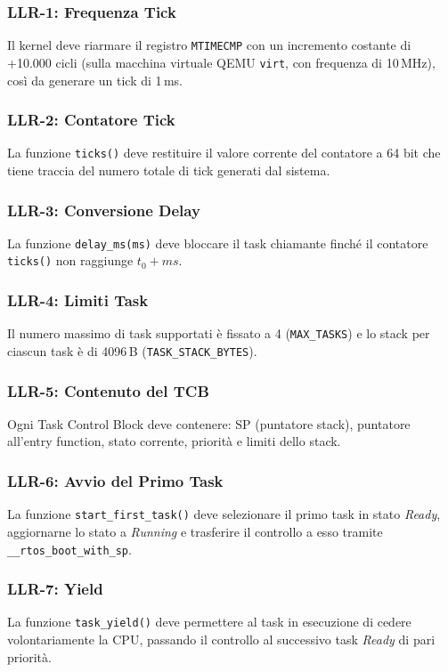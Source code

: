 \documentclass[italian, Lau, oneside]{sapthesis} %
\begin{document}
\subsubsection*{LLR-1: Frequenza Tick}
Il kernel deve riarmare il registro \texttt{MTIMECMP} con un incremento costante di +10.000 cicli (sulla macchina virtuale QEMU \texttt{virt}, con frequenza di 10\,MHz), così da generare un tick di 1\,ms.  

\subsubsection*{LLR-2: Contatore Tick}
La funzione \texttt{ticks()} deve restituire il valore corrente del contatore a 64 bit che tiene traccia del numero totale di tick generati dal sistema. 

\subsubsection*{LLR-3: Conversione Delay}
La funzione \texttt{delay\_ms(ms)} deve bloccare il task chiamante finché il contatore \texttt{ticks()} non raggiunge \(t_0 + ms\).  

\subsubsection*{LLR-4: Limiti Task}
Il numero massimo di task supportati è fissato a 4 (\texttt{MAX\_TASKS}) e lo stack per ciascun task è di 4096\,B (\texttt{TASK\_STACK\_BYTES}).  

\subsubsection*{LLR-5: Contenuto del TCB}
Ogni Task Control Block deve contenere: SP (puntatore stack), puntatore all’entry function, stato corrente, priorità e limiti dello stack.  

\subsubsection*{LLR-6: Avvio del Primo Task}
La funzione \texttt{start\_first\_task()} deve selezionare il primo task in stato \emph{Ready}, aggiornarne lo stato a \emph{Running} e trasferire il controllo a esso tramite \texttt{\_\_rtos\_boot\_with\_sp}.  

\subsubsection*{LLR-7: Yield}
La funzione \texttt{task\_yield()} deve permettere al task in esecuzione di cedere volontariamente la CPU, passando il controllo al successivo task \emph{Ready} di pari priorità.  
\end{document}
